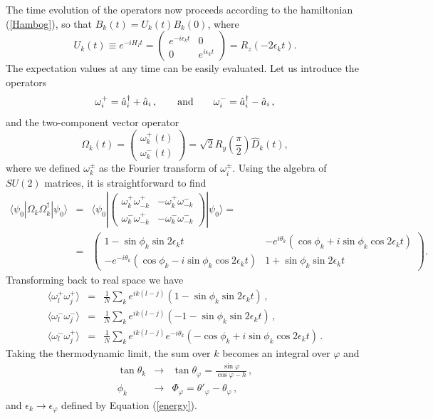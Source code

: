 \documentclass[12pt,preprint,tighten,eqsecnum,aps,floats,psfig,epsfig,amsmath,onecolumn]{revtex4-1}
\def\be{\begin{equation}}
\def\ee{\end{equation}}
\def\bea{\begin{eqnarray}}
\def\eea{\end{eqnarray}}
\def\e{\epsilon}
\def\o{\omega}
\def\p{\varphi}
\def\Fa{\hat{a}}
\def\FD{\hat{D}}
\begin{document}
The time evolution of the operators now proceeds according to the hamiltonian
(\ref{Hambog}), so that $B_k(t) = U_k(t) B_k(0)$, where 
\be 
U_k(t) \equiv e^{-i H_I t}=
\begin{pmatrix}
e^{-i \e_k t} & 0\\
0 & e^{i \e_k t}
\end{pmatrix}
= R_z(-2\e_k t). 
\ee 
The expectation values at any time can be easily evaluated.
Let us introduce the operators 
\be 
\o^+_i=\Fa^\dag_i+\Fa_i\,,\qquad {\rm and} \qquad 
\o^-_i=\Fa^\dag_i-\Fa_i\,,
\ee
and the two-component vector operator
\be 
\Omega_k(t) = \begin{pmatrix}
\o^+_k(t)\\\o^-_k(t)
\end{pmatrix}
= \sqrt{2} R_{y}\left(\frac{\pi}{2}\right) \FD_k(t), 
\ee 
where we defined $\o^{\pm}_k$ as the Fourier transform of 
$\o^{\pm}_i$. 
Using the algebra of $SU(2)$ matrices, it is straightforward to 
find \cite{sps-04}
\bea 
\langle\psi_0 | \Omega_k \Omega_k^\dag|\psi_0\rangle &=&
\langle\psi_0 |
\begin{pmatrix}
\o^+_k \o^+_{-k} & -\o^+_k \o^-_{-k} \nonumber\\
\o^-_k \o^+_{-k} & -\o^-_k \o^-_{-k}
\end{pmatrix}
|\psi_0\rangle =\\
&=& \begin{pmatrix}
1 - \sin\phi_k\sin 2\e_k t & -e^{i \theta_k} (\cos \phi_k + i \sin\phi_k\cos 2\e_k t)\\
-e^{-i \theta_k} (\cos \phi_k - i \sin\phi_k \cos 2\e_k t) &
1 + \sin\phi_k\sin 2\e_k t
\end{pmatrix}.
\eea
Transforming back to real space we have 
\bea
\langle \o^+_l\o^+_j\rangle &=& 
\frac{1}{N}\sum_k e^{ik(l-j)}(1-\sin\phi_k\sin 2\e_k t)\,,\nonumber\\
\langle \o^-_l\o^-_j\rangle &=& 
\frac{1}{N}\sum_k e^{ik(l-j)}(-1-\sin\phi_k\sin 2\e_k t)\,,\nonumber\\
\langle \o^-_l\o^+_j\rangle &=& 
\frac{1}{N}\sum_k e^{ik(l-j)}e^{-i\theta_k}(-\cos\phi_k+ i\sin\phi_k\cos 2\e_k t)\,. 
\label{timeev}
\eea
Taking the thermodynamic limit, the sum over $k$ becomes 
an integral over $\p$ and
\bea
\tan\theta_k&\rightarrow& \tan\theta_\p= \frac{\sin\p}{\cos\p-h}\,,\nonumber\\
\phi_k&\rightarrow& \Phi_\p= \theta'_\p-\theta_\p\,, 
\eea
and $\e_k\rightarrow\e_\p$ defined by Equation (\ref{energy}).
\end{document}
